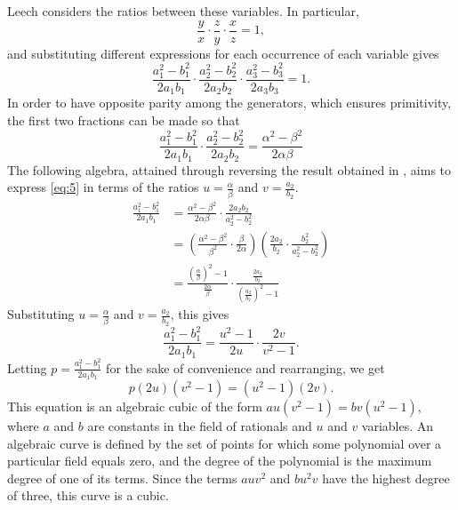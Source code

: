 \documentclass[11pt]{article}
\begin{document}
Leech considers the ratios between these variables. In particular,
$$\frac{y}{x}\cdot\frac{z}{y}\cdot\frac{x}{z}=1,$$
and substituting different expressions for each occurrence of each variable gives
$$\frac{a_1^2-b_1^2}{2a_1b_1}\cdot\frac{a_2^2-b_2^2}{2a_2b_2}\cdot\frac{a_3^2-b_3^2}{2a_3b_3}=1.$$
In order to have opposite parity among the generators, which ensures primitivity, the first two fractions can be made so that
\begin{equation}
\frac{a_1^2-b_1^2}{2a_1b_1}\cdot\frac{a_2^2-b_2^2}{2a_2b_2}=\frac{\alpha^2-\beta^2}{2\alpha\beta}
\label{eq:5}
\end{equation}
The following algebra, attained through reversing the result obtained in \cite{leech}, aims to express \eqref{eq:5} in terms of the ratios $u=\frac{\alpha}{\beta}$ and $v=\frac{a_2}{b_2}$.
\begin{equation*}
\begin{aligned}
\frac{a_1^2-b_1^2}{2a_1b_1}&=\frac{\alpha^2-\beta^2}{2\alpha\beta}\cdot\frac{2a_2b_2}{a_2^2-b_2^2} \\
&=\left(\frac{\alpha^2-\beta^2}{\beta^2}\cdot\frac{\beta}{2\alpha}\right)\left(\frac{2a_2}{b_2}\cdot\frac{b_2^2}{a_2^2-b_2^2}\right) \\
&=\frac{\left(\frac{\alpha}{\beta}\right)^2-1}{\frac{2\alpha}{\beta}}\cdot{\frac{\frac{2a_2}{b_2}}{\left(\frac{a_2}{b_2}\right)^2-1}}
\end{aligned}
\end{equation*}
Substituting $u=\frac{\alpha}{\beta}$ and $v=\frac{a_2}{b_2}$, this gives
$$\frac{a_1^2-b_1^2}{2a_1b_1}=\frac{u^2-1}{2u}\cdot\frac{2v}{v^2-1}.$$
Letting $p=\frac{a_1^2-b_1^2}{2a_1b_1}$ for the sake of convenience and rearranging, we get
\begin{equation}
p(2u)(v^2-1)=(u^2-1)(2v).
\end{equation}
This equation is an algebraic cubic of the form $au(v^2-1)=bv(u^2-1)$, where $a$ and $b$ are constants in the field of rationals and $u$ and $v$ variables. An algebraic curve is defined by the set of points for which some polynomial over a particular field equals zero, and the degree of the polynomial is the maximum degree of one of its terms. Since the terms $auv^2$ and $bu^2v$ have the highest degree of three, this curve is a cubic.
\end{document}
